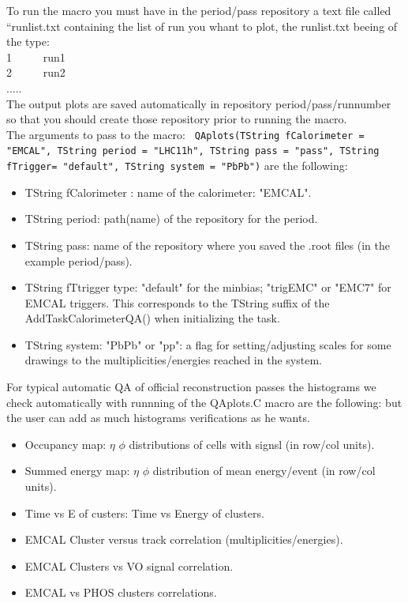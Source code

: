 To run the macro you must have in the period/pass repository a text file called ``runlist.txt containing the list of run you whant to plot, the runlist.txt beeing of the type:\\
1 ~~~~~run1\\
2 ~~~~~run2\\
.....\\
The output plots are saved automatically in repository period/pass/runnumber so that you should create those repository prior to running the macro.\\
 


The arguments to pass to the macro:
\texttt{ QAplots(TString fCalorimeter = "EMCAL", TString period = "LHC11h", TString pass = "pass", TString fTrigger= "default", TString system = "PbPb")} are the following:
\begin{itemize}
\item  TString fCalorimeter : name of the calorimeter: "EMCAL".
\item  TString period: path(name) of the repository  for  the period. 
\item  TString pass: name of the repository where you saved the .root files (in the example period/pass).
\item  TString fTtrigger type: "default" for the minbias; "trigEMC" or "EMC7" for EMCAL triggers. This corresponds to the TString suffix of the AddTaskCalorimeterQA() when initializing the task.
\item  TString system: "PbPb" or "pp": a flag for setting/adjusting scales for some drawings to the multiplicities/energies reached in the system.
\end{itemize}


For typical automatic QA of official reconstruction passes the histograms we check automatically with runnning of the QAplots.C  macro are the following: but the user can add as much histograms verifications as he wants.
\begin{itemize}
\item Occupancy map: $\eta$ $\phi$ distributions of cells with signsl (in row/col units). 
\item Summed energy map: $\eta$ $\phi$  distribution of mean energy/event (in row/col units).
\item Time vs E of custers: Time vs Energy of clusters.
\item EMCAL Cluster versus track correlation (multiplicities/energies).
\item EMCAL Clusters vs VO signal correlation.
\item EMCAL vs PHOS clusters correlations.
\end{itemize}

